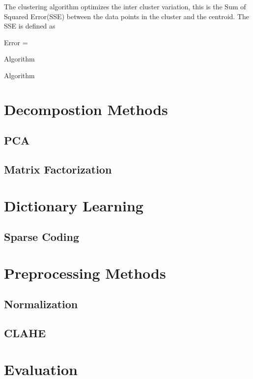 The clustering algorithm optimizes the inter cluster variation, this is the Sum of Squared Error(SSE) between the data points in the cluster and the centroid. 
The SSE  is defined as 

Error = 

Algorithm

Algorithm

\section{Decompostion Methods}

\subsection{PCA}
\subsection{Matrix Factorization}

\section{Dictionary Learning}
\subsection{Sparse Coding}

\section{Preprocessing Methods}
\subsection{Normalization}
\subsection{CLAHE}

\section{Evaluation}
